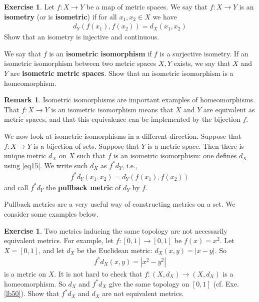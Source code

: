 \documentclass[12pt,b5paper,notitlepage]{article}
\theoremstyle{definition}
\newtheorem{exe}[df]{Exercise}
\newtheorem{rem}[df]{Remark}
\theoremstyle{plain}
\numberwithin{equation}{section}
\begin{document}
\begin{exe}\label{lb46}
Let $f:X\rightarrow Y$ be a map of metric spaces. We say that $f:X\rightarrow Y$ is an \textbf{isometry} (or is \textbf{isometric})  if for all $x_1,x_2\in X$ we have
\begin{align}
d_Y(f(x_1),f(x_2))=d_X(x_1,x_2) \label{eq15}
\end{align}
Show that an isometry is injective and continuous.

We say that $f$ is an \textbf{isometric isomorphism} if $f$ is a surjective isometry. If an isometric isomorphism between two metric spaces $X,Y$ exists, we say that $X$ and $Y$ are \textbf{isometric metric spaces}. Show that an isometric isomorphism is a homeomorphism.   \hfill\qedsymbol
\end{exe}

\begin{rem}
Isometric isomorphisms are important examples of homeomorphisms. That $f:X\rightarrow Y$ is an isometric isomorphism means that $X$ and $Y$ are equivalent as metric spaces, and that this equivalence can be implemented by the bijection $f$. 

We now look at isometric isomorphisms in a different direction. Suppose that $f:X\rightarrow Y$ is a bijection of sets. Suppose that $Y$ is a metric space. Then there is unique metric $d_X$ on $X$ such that $f$ is an isometric isomorphism: one defines $d_X$ using \eqref{eq15}. We write such $d_X$ as $f^*d_Y$,   i.e.,
\begin{align*}
f^*d_Y(x_1,x_2)=d_Y(f(x_1),f(x_2))
\end{align*}
and call $f^*d_Y$ the \textbf{pullback metric}  of $d_Y$ by $f$. \hfill\qedsymbol
\end{rem}

Pullback metrics are a very useful way of constructing metrics on a set. We consider some examples below. 


\begin{exe}\label{lb49}
Two metrics inducing the same topology are not necessarily equivalent metrics. For example, let $f:[0,1]\rightarrow [0,1]$ be $f(x)=x^2$. Let $X=[0,1]$, and let $d_X$ be the  Euclidean metric: $d_X(x,y)=|x-y|$. So
\begin{align*}
f^*d_X(x,y)=|x^2-y^2|
\end{align*}
is a metric on $X$. It is not hard to check that $f:(X,d_X)\rightarrow (X,d_X)$ is a homeomorphism.  So $d_X$ and $f^*d_X$ give the same topology on $[0,1]$ (cf. Exe. \ref{lb50}). Show that $f^*d_X$ and $d_X$ are not equivalent metrics.
\end{exe}
\end{document}
